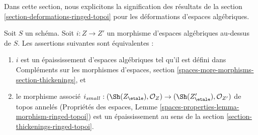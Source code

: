 \noindent
Dans cette section, nous explicitons la signification des résultats de la
section \ref{section-deformations-ringed-topoi} pour les déformations d'espaces
algébriques.

\begin{lemma}
\label{lemma-match-thickenings}
Soit $S$ un schéma. Soit $i : Z \to Z'$ un morphisme d'espaces algébriques
au-dessus de $S$. Les assertions suivantes sont équivalentes :
\begin{enumerate}
\item $i$ est un épaississement d'espaces algébriques tel qu'il est défini dans
Compléments sur les morphismes d'espaces, section
\ref{spaces-more-morphisms-section-thickenings}, et
\item le morphisme associé
$i_{small} : (\Sh(Z_\etale), \mathcal{O}_Z) \to
(\Sh(Z'_\etale), \mathcal{O}_{Z'})$
de topos annelés (Propriétés des espaces, Lemme
\ref{spaces-properties-lemma-morphism-ringed-topoi}) est un épaississement au
sens de la section \ref{section-thickenings-ringed-topoi}.
\end{enumerate}
\end{lemma}

